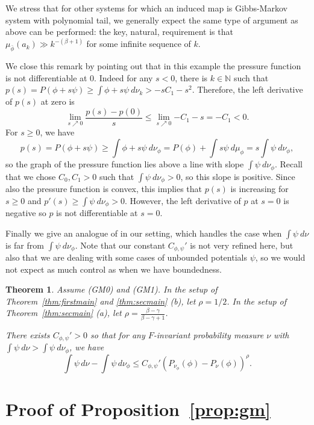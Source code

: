 \documentclass[12pt]{article}
\numberwithin{equation}{section}
\newtheorem{thm}{Theorem}[section]
\newcommand{\N}{\mathbb{N}}
\begin{document}
\begin{rmk}
We stress that for other systems for which an induced map is Gibbs-Markov system with polynomial tail, we generally expect the same type of argument as above can be performed: the key, natural, requirement is that $\mu_{\bar\phi}(a_k) \gg k^{-(\beta+1)}$ for some infinite sequence of $k$.

We close this remark by pointing out that in this example the pressure function is not differentiable at 0.  Indeed for any $s < 0$, 
there is $k \in \N$ such that $p(s) = P(\phi + s\psi)  \geq \int \phi + s \psi~d\nu_k > -s C_1 - s^2$.
Therefore, the left derivative of $p(s)$ at zero is
$$
\lim_{s \nearrow 0} \frac{p(s)-p(0)}{s} \leq \lim_{s \nearrow 0} {-C_1-s} = -C_1 < 0.
$$
For $s \geq 0$, we have
$$
  p(s) = P(\phi + s\psi)  \geq \int \phi + s \psi~d\nu_\phi = P(\phi) + \int  s \psi~d\mu_\phi = s \int  \psi~d\nu_\phi,
$$
so the graph of the pressure function lies above a line with slope $\int  \psi~d\nu_\phi$.
Recall that we chose $C_0, C_1 > 0$ such that $\int  \psi~d\nu_\phi > 0$, so this slope is positive.
Since also the pressure function is convex, this implies that $p(s)$ is increasing for $s \geq 0$ and $p'(s) \geq \int \psi~ d\nu_\phi > 0$.
However, the left derivative of $p$ at $s = 0$ is negative so $p$ is not differentiable at $s=0$.
\label{rmk:EKPfail}
\end{rmk}

Finally we give an analogue of \cite[Theorem 7.1]{RuhSar22} in our setting, which handles the case when $\int\psi~d\nu$ is far from $\int\psi~d\nu_\phi$.  Note that our constant $C_{\phi, \psi}'$ is not very refined here, but also that we are dealing with some cases of unbounded potentials $\psi$, so we would not expect as much control as when we have boundedness.

\begin{thm}\label{thm:bigint} Assume (GM0) and (GM1). In the setup of Theorem~\ref{thm:firstmain} and \ref{thm:secmain} (b), let $\rho=1/2$. 
 In the setup of Theorem~\ref{thm:secmain} (a), let $\rho=\frac{\beta-\gamma}{\beta-\gamma+1}$.

 There exists $C_{\phi, \psi}'>0$ 
  so that for any $F$-invariant probability measure $\nu$ with 
  $\int\psi~d\nu> \int\psi~d\nu_\phi$, we have
 \[
\int\psi\,d\nu-\int\psi\,d\nu_{\phi} 
     \le C_{\phi, \psi}'\left(P_{\nu_\phi}(\phi)-P_\nu(\phi)\right)^\rho.
     \] 
\end{thm}


\section{Proof of Proposition~\ref{prop:gm}}
\label{sub:firstprop}
\end{document}
